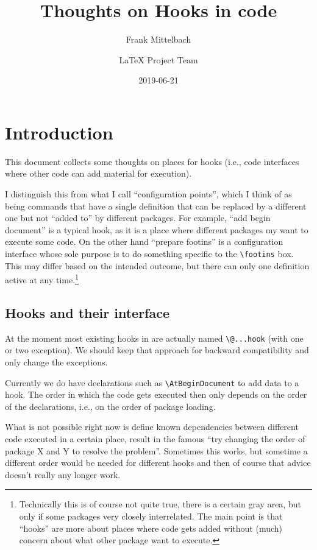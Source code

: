 \documentclass{article}
\title{Thoughts on Hooks in code}
\author{Frank Mittelbach \and
  \LaTeX{} Project Team}
\date{2019-06-21}
\newcounter{hook}
\newcounter{config}
\newcommand\cs[1]{\texttt{\textbackslash #1}}
\begin{document}
\maketitle

\tableofcontents

\section{Introduction}


This document collects some thoughts on places for hooks (i.e., code
interfaces where other code can add material for execution).

I distinguish this from what I call  ``configuration points'', which I think of as
being commands that have a single definition that can be replaced by a
different one but not ``added to'' by different packages. For example,
``add begin document'' is a typical hook, as it is a place where
different packages my want to execute some code. On the other hand
``prepare footins'' is a configuration interface whose sole purpose is
to do something specific to the \cs{footins} box. This may differ
based on the intended outcome, but there can only one definition active at any
time.\footnote{Technically this is of course not quite true, there is
  a certain gray area, but only if some packages very closely
  interrelated. The main point is that ``hooks'' are more about places
  where code gets added without (much) concern about what other
  package want to execute.}


\subsection{Hooks and their interface}

At the moment most existing hooks in \LaTeXe{} are actually named
\cs{@...hook} (with one or two exception). We should keep that
approach for backward compatibility and only change the exceptions.

Currently we do have declarations such as \cs{AtBeginDocument} to add
data to a hook.  The order in which the code gets executed then only
depends on the order of the declarations, i.e., on the order of
package loading.

What is not possible right now is define known dependencies between
different code executed in a certain place, result in the famous ``try
changing the order of package X and Y to resolve the
problem''. Sometimes this works, but sometime a different order would
be needed for different hooks and then of course that advice doesn't
really any longer work.
\end{document}
